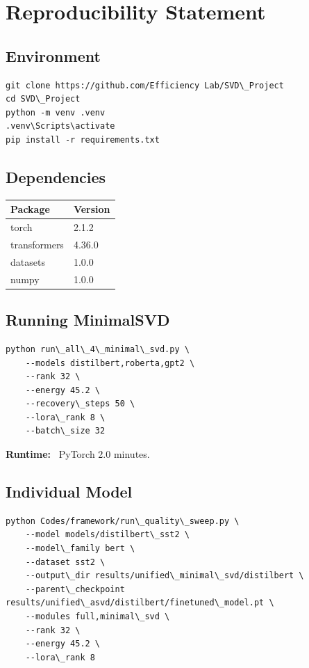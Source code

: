 
\section{Reproducibility Statement}

\subsection{Environment}

\begin{lstlisting}
git clone https://github.com/Efficiency Lab/SVD\_Project
cd SVD\_Project
python -m venv .venv
.venv\Scripts\activate
pip install -r requirements.txt
\end{lstlisting}

\subsection{Dependencies}

\begin{table}[H]
\centering
\small
\begin{tabular}{ll}
\toprule
\textbf{Package} & \textbf{Version} \\
\midrule
torch & 2.1.2 \\
transformers & 4.36.0 \\
datasets & 1.0.0 \\
numpy & 1.0.0 \\
\bottomrule
\end{tabular}
\end{table}

\subsection{Running MinimalSVD}

\begin{lstlisting}
python run\_all\_4\_minimal\_svd.py \
    --models distilbert,roberta,gpt2 \
    --rank 32 \
    --energy 45.2 \
    --recovery\_steps 50 \
    --lora\_rank 8 \
    --batch\_size 32
\end{lstlisting}

\textbf{Runtime:} ~PyTorch 2.0 minutes.

\subsection{Individual Model}

\begin{lstlisting}
python Codes/framework/run\_quality\_sweep.py \
    --model models/distilbert\_sst2 \
    --model\_family bert \
    --dataset sst2 \
    --output\_dir results/unified\_minimal\_svd/distilbert \
    --parent\_checkpoint results/unified\_asvd/distilbert/finetuned\_model.pt \
    --modules full,minimal\_svd \
    --rank 32 \
    --energy 45.2 \
    --lora\_rank 8
\end{lstlisting}

